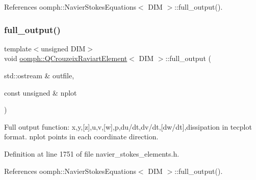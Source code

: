 References oomph\+::\+Navier\+Stokes\+Equations$<$ D\+I\+M $>$\+::full\+\_\+output().

\mbox{\label{classoomph_1_1QCrouzeixRaviartElement_aa38eca6cb5bfec6206d92ccfaa27177b}} 
\subsubsection{\texorpdfstring{full\+\_\+output()}{full\_output()}\hspace{0.1cm}{\footnotesize\ttfamily [2/2]}}
{\footnotesize\ttfamily template$<$unsigned D\+IM$>$ \\
void \hyperlink{classoomph_1_1QCrouzeixRaviartElement}{oomph\+::\+Q\+Crouzeix\+Raviart\+Element}$<$ D\+IM $>$\+::full\+\_\+output (\begin{DoxyParamCaption}\item[{std\+::ostream \&}]{outfile,  }\item[{const unsigned \&}]{nplot }\end{DoxyParamCaption})\hspace{0.3cm}{\ttfamily [inline]}}



Full output function\+: x,y,\mbox{[}z\mbox{]},u,v,\mbox{[}w\mbox{]},p,du/dt,dv/dt,\mbox{[}dw/dt\mbox{]},dissipation in tecplot format. nplot points in each coordinate direction. 



Definition at line 1751 of file navier\+\_\+stokes\+\_\+elements.\+h.



References oomph\+::\+Navier\+Stokes\+Equations$<$ D\+I\+M $>$\+::full\+\_\+output().

\mbox{\label{classoomph_1_1QCrouzeixRaviartElement_a2c4a2475b10e711163c3e63835acf9a8}} 
